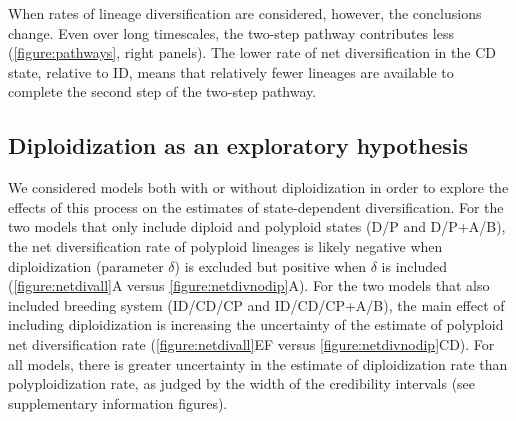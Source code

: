 When rates of lineage diversification are considered, however, the conclusions change.
Even over long timescales, the two-step pathway contributes less (\cref{figure:pathways}, right panels).
The lower rate of net diversification in the CD state, relative to ID, means that relatively fewer lineages are available to complete the second step of the two-step pathway.

\subsection{Diploidization as an exploratory hypothesis}

We considered models both with or without diploidization in order to explore the effects of this process on the estimates of state-dependent diversification.
For the two models that only include diploid and polyploid states (D/P and D/P+A/B), the net diversification rate of polyploid lineages is likely negative when diploidization (parameter $\delta$) is excluded but positive when $\delta$ is included (\cref{figure:netdivall}A versus \cref{figure:netdivnodip}A).
For the two models that also included breeding system (ID/CD/CP and ID/CD/CP+A/B), the main effect of including diploidization is increasing the uncertainty of the estimate of polyploid net diversification rate (\cref{figure:netdivall}EF versus \cref{figure:netdivnodip}CD).
For all models, there is greater uncertainty in the estimate of diploidization rate than polyploidization rate, as judged by the width of the credibility intervals (see supplementary information figures). %


